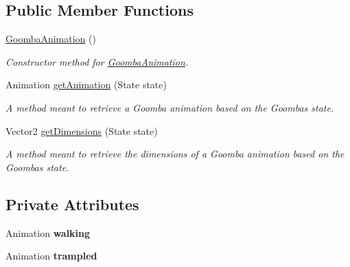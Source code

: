\subsection*{Public Member Functions}
\begin{DoxyCompactItemize}
\item 
\hyperlink{classnl_1_1arjanfrans_1_1mario_1_1graphics_1_1GoombaAnimation_a992fa17bfdfa40dea72f5f4453c821a6}{Goomba\+Animation} ()
\begin{DoxyCompactList}\small\item\em Constructor method for \hyperlink{classnl_1_1arjanfrans_1_1mario_1_1graphics_1_1GoombaAnimation}{Goomba\+Animation}. \end{DoxyCompactList}\item 
Animation \hyperlink{classnl_1_1arjanfrans_1_1mario_1_1graphics_1_1GoombaAnimation_a10532017e2baab74a43750e906a8bcdc}{get\+Animation} (State state)
\begin{DoxyCompactList}\small\item\em A method meant to retrieve a Goomba animation based on the Goomba\textquotesingle{}s state. \end{DoxyCompactList}\item 
Vector2 \hyperlink{classnl_1_1arjanfrans_1_1mario_1_1graphics_1_1GoombaAnimation_a49e10158e12095415ed637bc2092f546}{get\+Dimensions} (State state)
\begin{DoxyCompactList}\small\item\em A method meant to retrieve the dimensions of a Goomba animation based on the Goomba\textquotesingle{}s state. \end{DoxyCompactList}\end{DoxyCompactItemize}
\subsection*{Private Attributes}
\begin{DoxyCompactItemize}
\item 
\mbox{\label{classnl_1_1arjanfrans_1_1mario_1_1graphics_1_1GoombaAnimation_a292bc268550534422c4ea255a257f586}} 
Animation {\bfseries walking}
\item 
\mbox{\label{classnl_1_1arjanfrans_1_1mario_1_1graphics_1_1GoombaAnimation_a54a746c4e2d84985e07cc749077144f1}} 
Animation {\bfseries trampled}
\end{DoxyCompactItemize}
